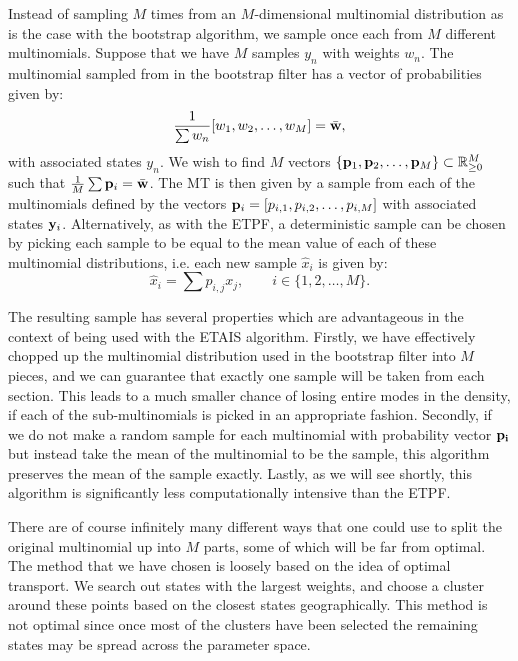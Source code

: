 \documentclass[final]{siamltex}
\begin{document}
Instead of sampling $M$ times from an $M$-dimensional multinomial
distribution as is the case with the bootstrap algorithm, we sample
once each from $M$ different multinomials. Suppose that we have $M$
samples $y_n$ with weights $w_n$. The multinomial sampled from in the
bootstrap filter has a vector of probabilities given by:
\begin{equation*}
\frac{1}{\sum w_n} [w_1,w_2,\ldots,w_M] = \bar{\bf w},
\end{equation*}
with associated states $y_n$.
We wish to find $M$ vectors $\{{\bf p}_1,{\bf p}_2,\ldots,{\bf p}_M\}
\subset \mathbb{R}^M_{\ge 0}$
such that  $\frac{1}{M} \sum {\bf p}_i = \bar{\bf w}$. The MT is then
given by a sample from each of the multinomials defined by the vectors
${\bf p}_i = [p_{i,1},p_{i,2},\ldots,p_{i,M}]$ with associated states ${\bf y}_i$. Alternatively, as with the ETPF, a deterministic sample
can be chosen by picking each sample to be equal to the mean value of
each of these multinomial distributions, i.e. each new sample
$\hat{x}_i$ is given by:
\begin{equation}
\hat{x}_i = \sum p_{i,j} x_j, \qquad i \in \{1,2,\ldots,M\}.
\end{equation}

The resulting sample has several properties which are advantageous in
the context of being used with the ETAIS algorithm. Firstly, we have
effectively chopped up the multinomial distribution used in the
bootstrap filter into $M$ pieces, and we can guarantee that exactly
one sample will be taken from each section. This leads to a much
smaller chance of losing entire modes in the density, if each of the
sub-multinomials is picked in an appropriate fashion. Secondly, if we do not make a random sample for
each multinomial with probability vector $\bf p_i$ but instead take
the mean of the multinomial to be the sample, this algorithm preserves
the mean of the sample exactly. Lastly, as we will see shortly, this
algorithm is significantly less computationally intensive than the
ETPF.

There are of course infinitely many different ways that one could use
to split the original multinomial up into $M$ parts, some of which
will be far from optimal. The method that we have chosen is loosely
based on the idea of optimal transport. We search out states with the
largest weights, and choose a cluster around these points based on
the closest states geographically. This method is not optimal since
once most of the clusters have been selected the remaining states
may be spread across the parameter space.
\end{document}
